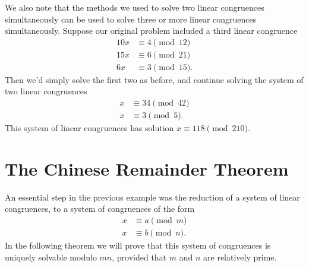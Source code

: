 We also note that the methods we used to solve two linear congruences simultaneously can be used to solve three or more linear congruences simultaneously. Suppose our original problem included a third linear congruence
\begin{align*}
  10x & \equiv 4 \pmod{12} \\
  15x & \equiv 6 \pmod{21} \\
  6x & \equiv 3 \pmod{15}.
\end{align*}
Then we'd simply solve the first two as before, and continue solving the system of two linear congruences
\begin{align*}
  x & \equiv 34 \pmod{42} \\
  x & \equiv 3 \pmod {5}.
\end{align*}
This system of linear congruences has solution $x\equiv 118 \pmod{210}$.

\section{The Chinese Remainder Theorem}

An essential step in the previous example was the reduction of a system of linear congruences, to a system of congruences of the form
\begin{align*}
  x & \equiv a \pmod{m} \\
  x & \equiv b \pmod{n}.
\end{align*}
In the following theorem we will prove that this system of congruences is uniquely solvable modulo $mn$, provided that $m$ and $n$ are relatively prime.

